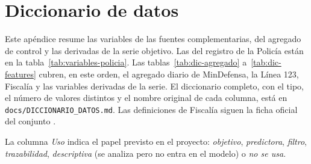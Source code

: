 
\section{Diccionario de datos}\label{ap:diccionario}

Este apéndice resume las variables de las fuentes complementarias, del agregado de control y las derivadas de la serie objetivo. Las del registro de la Policía están en la tabla~\ref{tab:variables-policia}. Las tablas~\ref{tab:dic-agregado} a~\ref{tab:dic-features} cubren, en este orden, el agregado diario de MinDefensa, la Línea 123, Fiscalía y las variables derivadas de la serie. El diccionario completo, con el tipo, el número de valores distintos y el nombre original de cada columna, está en \texttt{docs/DICCIONARIO\_\allowbreak{}DATOS.md}. Las definiciones de Fiscalía siguen la ficha oficial del conjunto \citep{fiscalia}.

La columna \emph{Uso} indica el papel previsto en el proyecto: \emph{objetivo}, \emph{predictora}, \emph{filtro}, \emph{trazabilidad}, \emph{descriptiva} (se analiza pero no entra en el modelo) o \emph{no se usa}.

